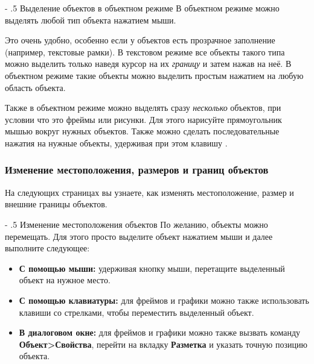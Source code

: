 ﻿\documentclass[a4paper,10pt]{article}
\makeatletter
\renewcommand\paragraph{%
   \@startsection{paragraph}{4}{0mm}%
      {-\baselineskip}%
      {.5\baselineskip}%
      {\normalfont\normalsize\bfseries}}
\makeatother
\begin{document}
\paragraph{Выделение объектов в объектном режиме}
В объектном режиме можно выделять любой тип объекта нажатием мыши.

Это очень удобно, особенно если у объектов есть прозрачное заполнение (например, текстовые рамки). В текстовом режиме все объекты такого типа можно выделить только наведя курсор на их \textit{границу} и затем нажав на неё. В объектном режиме такие объекты можно выделить простым нажатием на любую область объекта.

Также в объектном режиме можно выделять сразу \textit{несколько} объектов, при условии что это фреймы или рисунки. Для этого нарисуйте прямоугольник мышью  вокруг нужных объектов. Также можно сделать последовательные нажатия на нужные объекты, удерживая при этом клавишу .

\subsubsection{Изменение местоположения, размеров и границ объектов}
На следующих страницах вы узнаете, как изменять местоположение, размер и внешние границы объектов.

\paragraph{Изменение местоположения объектов}
По желанию, объекты можно перемещать. Для этого просто выделите объект нажатием мыши и далее выполните следующее:
\begin{itemize}
 \item \textbf{С помощью мыши:} удерживая кнопку мыши, перетащите выделенный объект на нужное место.
 \item \textbf{С помощью клавиатуры:} для фреймов и графики можно также использовать клавиши со стрелками, чтобы переместить выделенный объект.
 \item \textbf{В диалоговом окне:} для фреймов и графики можно также вызвать команду \textbf{Объект>Свойства}, перейти на вкладку \textbf{Разметка} и указать точную позицию объекта.
\end{itemize}
\end{document}
